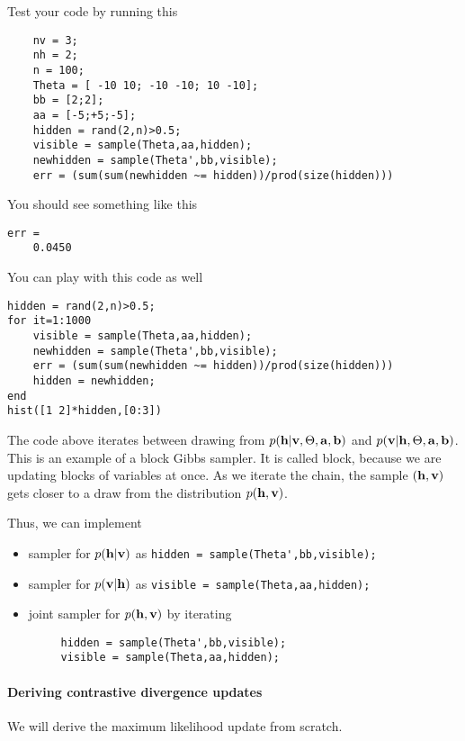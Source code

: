\documentclass{article}
\begin{document}
Test your code by running this
\begin{verbatim}
    nv = 3;
    nh = 2;
    n = 100;
    Theta = [ -10 10; -10 -10; 10 -10];
    bb = [2;2];
    aa = [-5;+5;-5];
    hidden = rand(2,n)>0.5;
    visible = sample(Theta,aa,hidden);
    newhidden = sample(Theta',bb,visible);
    err = (sum(sum(newhidden ~= hidden))/prod(size(hidden)))
\end{verbatim}
You should see something like this
\begin{verbatim}
err =
    0.0450
\end{verbatim}
You can play with this code as well
\begin{verbatim}
hidden = rand(2,n)>0.5;
for it=1:1000
    visible = sample(Theta,aa,hidden);
    newhidden = sample(Theta',bb,visible);
    err = (sum(sum(newhidden ~= hidden))/prod(size(hidden)))
    hidden = newhidden;
end
hist([1 2]*hidden,[0:3])
\end{verbatim}
The code above iterates between drawing from $p(\mathbf{h}|\mathbf{v},\Theta,\mathbf{a},\mathbf{b})$ and $p(\mathbf{v}|\mathbf{h},\Theta,\mathbf{a},\mathbf{b})$.
This is an example of a block Gibbs sampler. It is called block, because we are updating blocks of variables at once.
As we iterate the chain, the sample $(\mathbf{h},\mathbf{v})$ gets closer to a draw from the distribution $p(\mathbf{h},\mathbf{v})$.

Thus, we can implement
\begin{itemize}
\item sampler for $p(\mathbf{h}|\mathbf{v})$  as  \verb|hidden = sample(Theta',bb,visible);|
\item sampler for $p(\mathbf{v}|\mathbf{h})$ as  \verb|visible = sample(Theta,aa,hidden);|
\item joint sampler for $p(\mathbf{h},\mathbf{v})$ by iterating
\begin{verbatim}
     hidden = sample(Theta',bb,visible);
     visible = sample(Theta,aa,hidden);
\end{verbatim}
\end{itemize}
\newproblem{2pt} \paragraph{Deriving contrastive divergence updates}
We will derive the maximum likelihood update from scratch.
\end{document}
